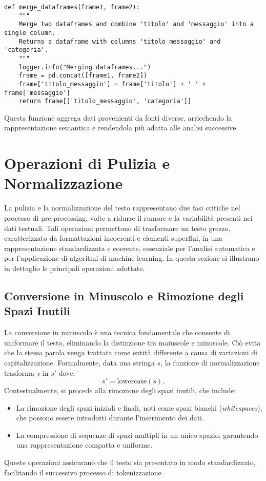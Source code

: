 \begin{lstlisting}[caption={Funzione per la fusione dei DataFrame}]
def merge_dataframes(frame1, frame2):
    """
    Merge two dataframes and combine 'titolo' and 'messaggio' into a single column.
    Returns a dataframe with columns 'titolo_messaggio' and 'categoria'.
    """
    logger.info("Merging dataframes...")
    frame = pd.concat([frame1, frame2])
    frame['titolo_messaggio'] = frame['titolo'] + ' ' + frame['messaggio']
    return frame[['titolo_messaggio', 'categoria']]
\end{lstlisting}

Questa funzione aggrega dati provenienti da fonti diverse, arricchendo la rappresentazione semantica e rendendola più adatta alle analisi successive.

\section{Operazioni di Pulizia e Normalizzazione}
La pulizia e la normalizzazione del testo rappresentano due fasi critiche nel processo di pre-processing, volte a ridurre il rumore e la variabilità presenti nei dati testuali. Tali operazioni permettono di trasformare un testo grezzo, caratterizzato da formattazioni incoerenti e elementi superflui, in una rappresentazione standardizzata e coerente, essenziale per l'analisi automatica e per l'applicazione di algoritmi di machine learning. In questa sezione si illustrano in dettaglio le principali operazioni adottate.

\subsection{Conversione in Minuscolo e Rimozione degli Spazi Inutili}
La conversione in minuscolo è una tecnica fondamentale che consente di uniformare il testo, eliminando la distinzione tra maiuscole e minuscole. Ciò evita che la stessa parola venga trattata come entità differente a causa di variazioni di capitalizzazione. Formalmente, data una stringa \( s \), la funzione di normalizzazione trasforma \( s \) in \( s' \) dove:
\[
s' = \text{lowercase}(s).
\]
Contestualmente, si procede alla rimozione degli spazi inutili, che include:
\begin{itemize}
    \item La rimozione degli spazi iniziali e finali, noti come spazi bianchi (\textit{whitespaces}), che possono essere introdotti durante l'inserimento dei dati.
    \item La compressione di sequenze di spazi multipli in un unico spazio, garantendo una rappresentazione compatta e uniforme.
\end{itemize}
Queste operazioni assicurano che il testo sia presentato in modo standardizzato, facilitando il successivo processo di tokenizzazione.

